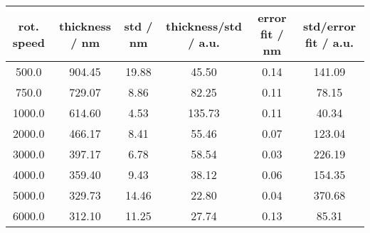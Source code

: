 \begin{tabular}{cccccc}
\toprule
rot. speed &  thickness / nm &  std / nm &  thickness/std / a.u. &  error fit / nm &  std/error fit / a.u. \\
\midrule
   500.0 &          904.45 &     19.88 &                 45.50 &            0.14 &                141.09 \\
   750.0 &          729.07 &      8.86 &                 82.25 &            0.11 &                 78.15 \\
  1000.0 &          614.60 &      4.53 &                135.73 &            0.11 &                 40.34 \\
  2000.0 &          466.17 &      8.41 &                 55.46 &            0.07 &                123.04 \\
  3000.0 &          397.17 &      6.78 &                 58.54 &            0.03 &                226.19 \\
  4000.0 &          359.40 &      9.43 &                 38.12 &            0.06 &                154.35 \\
  5000.0 &          329.73 &     14.46 &                 22.80 &            0.04 &                370.68 \\
  6000.0 &          312.10 &     11.25 &                 27.74 &            0.13 &                 85.31 \\
\bottomrule
\end{tabular}
